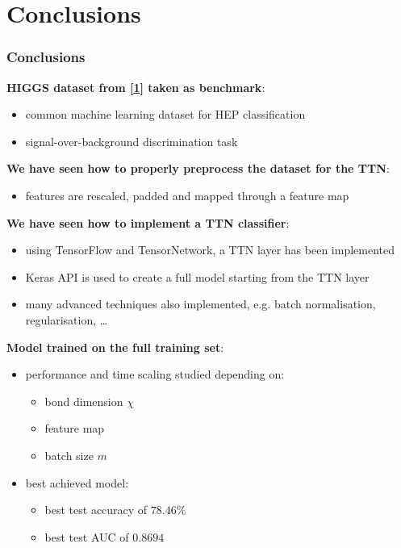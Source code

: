 \documentclass[xcolor=table,8pt]{beamer}
\begin{document}
    \section{Conclusions}

    \begin{frame}[t]
        \frametitle{Conclusions}
        
        \textbf{HIGGS dataset from [\href{https://arxiv.org/pdf/1402.4735.pdf}{\alert{1}}] taken as benchmark}:
        \begin{itemize}
            \item common machine learning dataset for HEP classification
            \item signal-over-background discrimination task
        \end{itemize}
        
        \medskip
        \textbf{We have seen how to properly preprocess the dataset for the TTN}:
        \begin{itemize}
            \item features are \alert{rescaled}, \alert{padded} and \alert{mapped} through a feature map
        \end{itemize}
        
        \medskip
        \textbf{We have seen how to implement a TTN classifier}:
        \begin{itemize}
            \item using \alert{TensorFlow} and \alert{TensorNetwork}, a TTN layer has been implemented
            \item Keras API is used to create a full model starting from the TTN layer
            \item many advanced techniques also implemented, e.g. batch normalisation, regularisation, \dots
        \end{itemize}
    
        \medskip
        \textbf{Model trained on the full training set}:
        \begin{itemize}
            \item \alert{performance and time scaling} studied depending on:
            \begin{itemize}
                \item bond dimension \alert{\( \chi \)}
                \item feature map
                \item batch size \alert{\( m \)}
            \end{itemize}
            \item best achieved model:
            \begin{itemize}
                \item best test accuracy of \( 78.46\% \)
                \item best test AUC of \( 0.8694 \)
            \end{itemize}
        \end{itemize}
    
    \end{frame}
\end{document}
